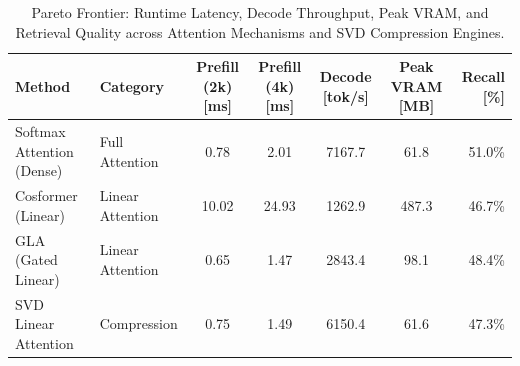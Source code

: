 \begin{table}[t]
\centering
\caption{Pareto Frontier: Runtime Latency, Decode Throughput, Peak VRAM, and Retrieval Quality across Attention Mechanisms and SVD Compression Engines.}
\label{tab:neuralops_pareto}
\small
\begin{tabular}{llccccr}
\toprule
\textbf{Method} & \textbf{Category} & \textbf{Prefill (2k) [ms]} & \textbf{Prefill (4k) [ms]} & \textbf{Decode [tok/s]} & \textbf{Peak VRAM [MB]} & \textbf{Recall [\%]} \\
\midrule
Softmax Attention (Dense) & Full Attention & 0.78 & 2.01 & 7167.7 & 61.8 & 51.0\% \\
Cosformer (Linear) & Linear Attention & 10.02 & 24.93 & 1262.9 & 487.3 & 46.7\% \\
GLA (Gated Linear) & Linear Attention & 0.65 & 1.47 & 2843.4 & 98.1 & 48.4\% \\
SVD Linear Attention & Compression & 0.75 & 1.49 & 6150.4 & 61.6 & 47.3\% \\
\bottomrule
\end{tabular}
\end{table}
